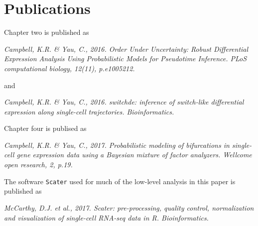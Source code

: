 \chapter*{Publications}



Chapter two is published as 
\begin{displayquote}
\emph{Campbell, K.R. \& Yau, C., 2016. Order Under Uncertainty: Robust Differential Expression Analysis Using Probabilistic Models for Pseudotime Inference. PLoS computational biology, 12(11), p.e1005212.}
\end{displayquote}
and
\begin{displayquote}
\emph{Campbell, K.R. \& Yau, C., 2016. switchde: inference of switch-like differential expression along single-cell trajectories. Bioinformatics.
}
\end{displayquote}
Chapter four is publised as
\begin{displayquote}
\emph{Campbell, K.R. \& Yau, C., 2017. Probabilistic modeling of bifurcations in single-cell gene expression data using a Bayesian mixture of factor analyzers. Wellcome open research, 2, p.19. 
}
\end{displayquote}
The software \texttt{Scater} used for much of the low-level analysis in this paper is published as
\begin{displayquote}
\emph{McCarthy, D.J. et al., 2017. Scater: pre-processing, quality control, normalization and visualization of single-cell RNA-seq data in R. Bioinformatics.}
\end{displayquote}

